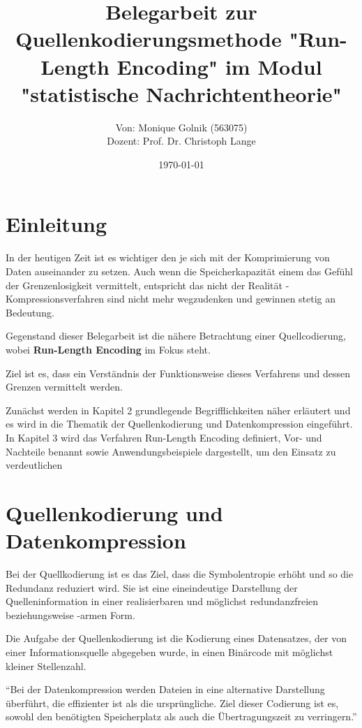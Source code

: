 \documentclass[11pt,a4paper,ngerman]{report}
\date{\today}
\title{Belegarbeit zur Quellenkodierungsmethode \textbf{"Run-Length Encoding"} im Modul "statistische Nachrichtentheorie"}
\author{Von: Monique Golnik (563075) \\Dozent: Prof. Dr. Christoph Lange}
\begin{document}
	\maketitle
	\tableofcontents


	
	\chapter{Einleitung}
	In der heutigen Zeit ist es wichtiger den je sich mit der Komprimierung von Daten auseinander zu setzen. Auch wenn die Speicherkapazität einem das Gefühl der Grenzenlosigkeit vermittelt, entspricht das nicht der Realität - Kompressionsverfahren sind nicht mehr wegzudenken und gewinnen stetig an Bedeutung.
	
	
	Gegenstand dieser Belegarbeit ist die nähere Betrachtung einer Quellcodierung, wobei  \textbf{Run-Length Encoding} im Fokus steht.
	
	
	Ziel ist es, dass ein Verständnis der Funktionsweise dieses Verfahrens und dessen Grenzen vermittelt werden.
    
    
	Zunächst werden in Kapitel 2 grundlegende Begrifflichkeiten näher erläutert und es wird in die Thematik der Quellenkodierung und Datenkompression eingeführt. In Kapitel 3 wird das Verfahren Run-Length Encoding definiert, Vor- und Nachteile benannt sowie Anwendungsbeispiele dargestellt, um den Einsatz zu verdeutlichen



	\chapter{Quellenkodierung und Datenkompression}
	
		Bei der Quellkodierung ist es das Ziel, dass die Symbolentropie erhöht und so die Redundanz reduziert wird. Sie ist eine eineindeutige Darstellung der Quelleninformation in einer realisierbaren und möglichst redundanzfreien beziehungsweise -armen Form.
		
		Die Aufgabe der Quellenkodierung ist die Kodierung eines Datensatzes, der von einer Informationsquelle abgegeben wurde, in einen Binärcode mit möglichst kleiner Stellenzahl. \cite[Seite 47 ff.]{Lange2021}
	     
	    \enquote{Bei der Datenkompression werden Dateien in eine alternative Darstellung überführt, die effizienter ist als die ursprüngliche. Ziel dieser Codierung ist es, sowohl den benötigten Speicherplatz als auch die Übertragungszeit zu verringern.} \cite{IONOS} 
	
\end{document}
